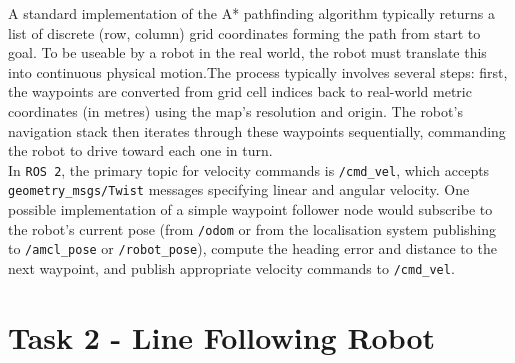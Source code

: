 \documentclass[11 pt , a 4 paper ]{article}
\theoremstyle{definition}
\begin{document}
\begin{enumerate}
     \newline \noindent A standard implementation of the A* pathfinding algorithm typically returns a list of discrete (row, column) grid coordinates forming the path from start to goal. To be useable by a robot in the real world, the robot must translate this into continuous physical motion.The process typically involves several steps: first, the waypoints are converted from grid cell indices back to real-world metric coordinates (in metres) using the map's resolution and origin. The robot's navigation stack then iterates through these waypoints sequentially, commanding the robot to drive toward each one in turn. \\
     \newline \noindent In \texttt{ROS 2}, the primary topic for velocity commands is \texttt{/cmd\_vel}, which accepts \texttt{geometry\_msgs/Twist} messages specifying linear and angular velocity. One possible implementation of a simple waypoint follower node would subscribe to the robot's current pose (from \texttt{/odom} or from the localisation system publishing to \texttt{/amcl\_pose} or \texttt{/robot\_pose}), compute the heading error and distance to the next waypoint, and publish appropriate velocity commands to \texttt{/cmd\_vel}.
 \end{enumerate}

  \section*{Task 2 - Line Following Robot}
\end{document}

